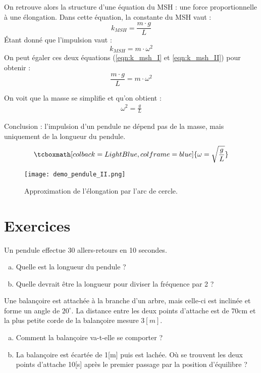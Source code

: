 On retrouve alors la structure d'une équation du MSH : une force proportionnelle à une élongation.
Dans cette équation, la constante du MSH vaut :
\begin{equation}
    \label{eqn:k_msh_I}
    k_{MSH}=\frac{m \cdot g}{L}
\end{equation}
Étant donné que l'impulsion vaut :
\begin{equation}
    \label{eqn:k_msh_II}
    k_{MSH}=m \cdot \omega^2
\end{equation}
On peut égaler ces deux équations (\ref{eqn:k_msh_I} et \ref{eqn:k_msh_II}) pour obtenir :
\begin{equation}
    \frac{m \cdot g}{L} = m \cdot \omega^2
\end{equation}

On voit que la masse se simplifie et qu'on obtient :
\begin{align}
    \omega^2=\frac{g}{L}
\end{align}

Conclusion : l'impulsion d'un pendule ne dépend pas de la masse, mais uniquement de la longueur du pendule.
\begin{equation}
    \tcboxmath[colback=LightBlue,colframe=blue]{\omega = \sqrt{\frac{g}{L}}}
\end{equation}


\begin{figure}[ht!]
    \centering
    \texttt{[image: demo\_pendule\_II.png]}
    \caption{Approximation de l'élongation par l'arc de cercle.}
    \label{fig:demo_pendule_II}
\end{figure}

\newpage

\section{Exercices}
\begin{exercise}
    Un pendule effectue 30 allers-retours en 10 secondes.
    \begin{enumerate}[a)]
        \item Quelle est la longueur du pendule ?
        \item Quelle devrait être la longueur pour diviser la fréquence par 2 ?
    \end{enumerate}
\end{exercise}

\begin{exercise}
    Une balançoire est attachée à la branche d'un arbre, mais celle-ci est inclinée et forme un angle de \(20^{\circ}\). La distance entre les deux points d'attache est de 70cm et la plus petite corde de la balançoire mesure \(3[m]\).
    \begin{enumerate}[a)]
        \item Comment la balançoire va-t-elle se comporter ?
        \item La balançoire est écartée de 1[m] puis est lachée. Où se trouvent les deux points d'attache 10[s] après le premier passage par la position d'équilibre ?
    \end{enumerate}
\end{exercise}

